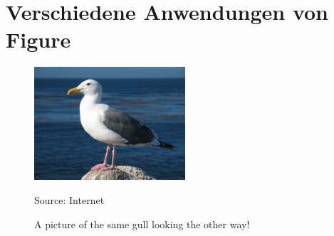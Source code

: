 \documentclass[10pt, a4paper]{article}
\begin{document}
\section{Verschiedene Anwendungen von Figure}


\begin{figure}[h]
\centering
\end{figure}

\begin{figure}[h]
  \centering
      \includegraphics[width=0.5\textwidth]{pics/gull_picture}\par %
      Source: Internet
  \caption{A picture of the same gull
           looking the other way!}
\end{figure}
\newpage
\end{document}
